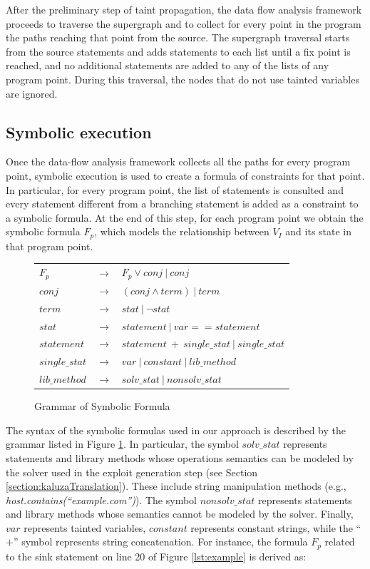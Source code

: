 After the preliminary step of taint propagation, the data flow analysis framework proceeds to traverse the supergraph and to collect for every point in the program the paths reaching that point from the source. The supergraph traversal starts from the source statements and adds statements to each list until a fix point is reached, and no additional statements are added to any of the lists of any program point. During this traversal, the nodes that do not use tainted variables are ignored. 


\subsection{Symbolic execution} Once the data-flow analysis framework collects all the paths for every program point, symbolic execution is used to create a formula of constraints for that point. In particular, for every program point, the list of statements is consulted and every statement different from a branching statement is added as a constraint to a symbolic formula. At the end of this step, for each program point we obtain the symbolic formula $F_p$, which models the relationship between $V_I$ and its state in that program point. 

\begin{figure}[h]
  \centering
		\begin{tabular}{lll}
			$F_p$  & $\rightarrow$ & $F_{p} \vee conj \ \vert \ conj$ \\
			$conj$ & $\rightarrow$ & $(conj \wedge term)\ \vert\ term$ \\
			$term$ & $\rightarrow$ & $stat\ \vert\ \neg stat$ \\
			$stat$ & $\rightarrow$ & $statement\ \vert\ var == statement$\\
			$statement$ & $\rightarrow$ & $statement\ +\ single\_stat\ \vert\ single\_stat$\\
			$single\_stat$ & $\rightarrow$ & $var\ \vert\ constant\ \vert\ lib\_method$ \\
			$lib\_method$ & $\rightarrow$ & $solv\_stat\ \vert\ nonsolv\_stat$ \\
		\end{tabular}
  	\caption{Grammar of Symbolic Formula}
	\label{fig:grammar}
 \end{figure}

The syntax of the symbolic formulas used in our approach is described by the grammar listed in Figure \ref{fig:grammar}. 
In particular, the symbol $solv\_stat$ represents statements and library methods whose operations semantics can be modeled by the solver used in the exploit generation step (see Section \ref{section:kaluzaTranslation}). These include string manipulation methods (e.g., \emph{host.contains(``example.com'')}).
The symbol $nonsolv\_stat$ represents statements and library methods whose semantics cannot be modeled by the solver. Finally, $var$ represents tainted variables, $constant$ represents constant strings, while the ``$+$'' symbol represents string concatenation. For instance, the formula $F_p$ related to the sink statement on line 20 of Figure \ref{lst:example} is derived as:

